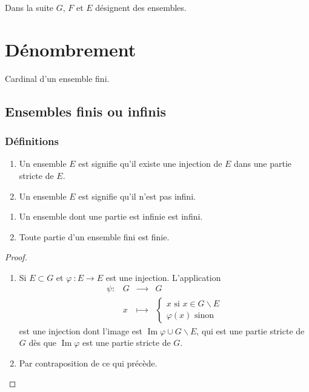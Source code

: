 
Dans la suite \(𝐺\), \(𝐹\) et \(𝐸\) désignent des ensembles.
%
\section{Dénombrement}
Cardinal d’un ensemble fini.
\subsection{Ensembles finis ou infinis}
\subsubsection{Définitions}
\begin{definition}
\par\noindent
\begin{enumerate}
\item Un ensemble \(𝐸\) est  signifie qu'il existe une injection de \(𝐸\) dans une
partie stricte de \(𝐸\).
\item Un ensemble \(𝐸\) est  signifie qu'il n'est pas infini.
\end{enumerate}
\end{definition}
\begin{theorem}
\par\noindent
\begin{enumerate}
\item Un ensemble dont une partie est infinie est infini.
\item Toute partie d'un ensemble fini est finie.
\end{enumerate}
\end{theorem}
\begin{proof}
\par\noindent
\begin{enumerate}
\item Si \(𝐸⊂𝐺\) et \(𝜑~:𝐸→𝐸\) est une injection. L'application
\begin{equation*}
\begin{matrix}
𝜓:&𝐺&⟶&𝐺
\\
&𝑥&⟼&\begin{cases}
𝑥\text{ si }𝑥∈𝐺∖𝐸
\\
𝜑(𝑥)\text{ sinon}
\end{cases}
\end{matrix}
\end{equation*}
est une injection dont l'image est \(\operatorname{Im}𝜑∪𝐺∖𝐸\), qui est une partie stricte de \(𝐺\) dès que \(\operatorname{Im}𝜑\) est
une partie stricte de \(𝐺\).
\item Par contraposition de ce qui précède.
\end{enumerate}
\end{proof}
